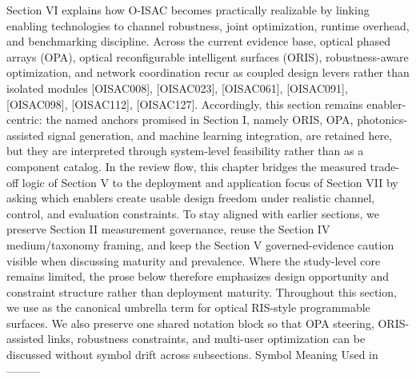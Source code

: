 {}Section VI explains how O-ISAC becomes practically realizable by linking enabling technologies to channel robustness, joint optimization, runtime overhead, and benchmarking discipline. Across the current evidence base, optical phased arrays (OPA), optical reconfigurable intelligent surfaces (ORIS), robustness-aware optimization, and network coordination recur as coupled design levers rather than isolated modules [O\markdownRendererUnderscore{}ISAC\markdownRendererUnderscore{}008], [O\markdownRendererUnderscore{}ISAC\markdownRendererUnderscore{}023], [O\markdownRendererUnderscore{}ISAC\markdownRendererUnderscore{}061], [O\markdownRendererUnderscore{}ISAC\markdownRendererUnderscore{}091], [O\markdownRendererUnderscore{}ISAC\markdownRendererUnderscore{}098], [O\markdownRendererUnderscore{}ISAC\markdownRendererUnderscore{}112], [O\markdownRendererUnderscore{}ISAC\markdownRendererUnderscore{}127]. Accordingly, this section remains enabler-centric: the named anchors promised in Section I, namely ORIS, OPA, photonics-assisted signal generation, and machine learning integration, are retained here, but they are interpreted through system-level feasibility rather than as a component catalog. In the review flow, this chapter bridges the measured trade-off logic of Section V to the deployment and application focus of Section VII by asking which enablers create usable design freedom under realistic channel, control, and evaluation constraints. To stay aligned with earlier sections, we preserve Section II measurement governance, reuse the Section IV medium/taxonomy framing, and keep the Section V governed-evidence caution visible when discussing maturity and prevalence. Where the study-level core remains limited, the prose below therefore emphasizes design opportunity and constraint structure rather than deployment maturity.\markdownRendererParagraphSeparator
{}Throughout this section, we use  as the canonical umbrella term for optical RIS-style programmable surfaces. We also preserve one shared notation block so that OPA steering, ORIS-assisted links, robustness constraints, and multi-user optimization can be discussed without symbol drift across subsections.\markdownRendererParagraphSeparator
{}\markdownRendererParagraphSeparator
{}\markdownRendererPipe{} Symbol \markdownRendererPipe{} Meaning \markdownRendererPipe{} Used in \markdownRendererPipe{}\markdownRendererSoftLineBreak
{}\markdownRendererPipe{}---\markdownRendererPipe{}---\markdownRendererPipe{}---\markdownRendererPipe{}\markdownRendererSoftLineBreak
